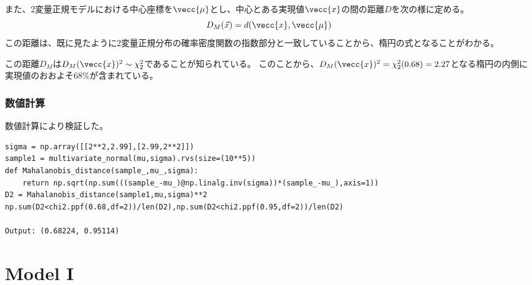 また、2変量正規モデルにおける中心座標を$\vecc{\mu}$とし、中心とある実現値$\vecc{x}$の間の距離$D$を次の様に定める。
\begin{equation*}
 D_M(\vec{x}) = d(\vecc{x},\vecc{\mu})
\end{equation*}
この距離は、既に見たように2変量正規分布の確率密度関数の指数部分と一致していることから、楕円の式となることがわかる。

この距離$D_M$は$D_M(\vecc{x})^2\sim \chi^2_2$であることが知られている。
このことから、$D_M(\vecc{x})^2 = \chi^2_2(0.68)=2.27$となる楕円の内側に実現値のおおよそ$68\%$が含まれている。

\subsubsection{数値計算}
数値計算により検証した。
\begin{lstlisting}
sigma = np.array([[2**2,2.99],[2.99,2**2]])
sample1 = multivariate_normal(mu,sigma).rvs(size=(10**5))
def Mahalanobis_distance(sample_,mu_,sigma):
    return np.sqrt(np.sum(((sample_-mu_)@np.linalg.inv(sigma))*(sample_-mu_),axis=1))
D2 = Mahalanobis_distance(sample1,mu,sigma)**2
np.sum(D2<chi2.ppf(0.68,df=2))/len(D2),np.sum(D2<chi2.ppf(0.95,df=2))/len(D2)

Output: (0.68224, 0.95114)
\end{lstlisting}



\section{Model I}

\fi

